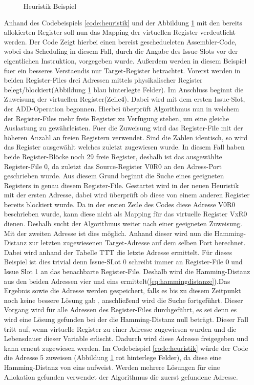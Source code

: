 \begin{figure}[htbp] 
	\centering
	
	\caption{Heuristik Beispiel}
	\label{fig:heuristik}
\end{figure}

Anhand des Codebeispiels \ref{code:heuristik} und der Abbildung \ref{fig:heuristik} mit den bereits allokierten Register soll nun das Mapping der virtuellen Register verdeutlicht werden.
Der Code Zeigt hierbei einen bereist geschedueleten Assembler-Code, wobei das Scheduling in diesem Fall, durch die Angabe des Issue-Slots vor der eigentlichen Instruktion, vorgegeben wurde. Außerdem werden in diesem Beispiel fuer ein besseres Verstaendis nur Target-Register betrachtet.
Vorerst werden in beiden Register-Files drei Adressen mittels physikalischer Register belegt/blockiert(Abbildung \ref{fig:heuristik} blau hinterlegte Felder). Im Anschluss beginnt die Zuweisung der virtuellen Register(Zeile4).
Dabei wird mit dem ersten Issue-Slot, der ADD-Operation begonnen. Hierbei  überprüft Algorithmus nun in welchem der Register-Files mehr freie Register zu Verfügung stehen, um eine gleiche Auslastung zu gewährleisten. Fuer die Zuweisung wird das Register-File mit der höheren Anzahl an freien Registern verwendet. Sind die Zahlen identisch, so wird das Register ausgewählt welches zuletzt zugewiesen wurde. In diesem Fall haben beide Register-Blöcke noch 29 freie Register, deshalb ist das ausgewählte Register-File 0, da zuletzt das Source-Register V0R0 an den Adress-Port geschrieben wurde.
Aus diesem Grund beginnt die Suche eines geeigneten Registers in genau diesem Register-File. Gestartet wird in der neuen Heuristik mit der ersten Adresse, dabei wird überprüft ob diese von einem anderen Register bereits blockiert wurde. Da in der ersten Zeile des Codes diese Adresse V0R0 beschrieben wurde, kann diese nicht als Mapping für das virtuelle Register VxR0 dienen. Deshalb sucht der Algorithmus weiter nach einer geeigneten Zuweisung. Mit der zweiten Adresse ist dies möglich. Anhand dieser wird nun die Hamming-Distanz zur letzten zugewiesenen Target-Adresse auf dem selben Port berechnet. Dabei wird anhand der Tabelle TTT die letzte Adresse ermittelt. Für dieses Beispiel ist dies trivial denn Issue-SLot 0 schreibt immer an Register-File 0 und Issue Slot 1 an das benachbarte Register-File. Deshalb wird die Hamming-Distanz aus den beiden Adressen vier und eins ermittelt(\ref{eq:hammingdistanze}).Das Ergebnis sowie die Adresse werden gespeichert, falls es bis zu diesem Zeitpunkt noch keine bessere Lösung gab , anschließend wird die Suche fortgeführt. Dieser Vorgang wird für alle Adressen des Register-Files durchgeführt, es sei denn es wird eine Lösung gefunden bei der die Hamming-Distanz null beträgt. Dieser Fall tritt auf, wenn virtuelle Register zu einer Adresse zugewiesen wurden und die Lebensdauer dieser Variable erlischt. Dadurch wird diese Adresse freigegeben und kann erneut zugewiesen werden. Im Codebeispiel \ref{code:heuristik} würde der Code die Adresse 5 zuweisen (Abbildung \ref{fig:heuristik} rot hinterlege Felder), da diese eine Hamming-Distanz von eins aufweist. Werden mehrere Lösungen für eine Allokation gefunden verwendet der Algorithmus die zuerst gefundene Adresse.
